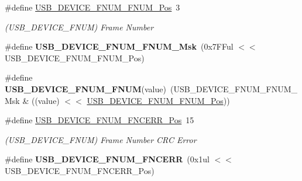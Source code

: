 \begin{DoxyCompactItemize}
\item 
\hypertarget{group___s_a_m_l21___u_s_b_ga6115591a45b1f5bccf3f15a866ed8e81}{}\#define \hyperlink{group___s_a_m_l21___u_s_b_ga6115591a45b1f5bccf3f15a866ed8e81}{U\+S\+B\+\_\+\+D\+E\+V\+I\+C\+E\+\_\+\+F\+N\+U\+M\+\_\+\+F\+N\+U\+M\+\_\+\+Pos}~3\label{group___s_a_m_l21___u_s_b_ga6115591a45b1f5bccf3f15a866ed8e81}

\begin{DoxyCompactList}\small\item\em (U\+S\+B\+\_\+\+D\+E\+V\+I\+C\+E\+\_\+\+F\+N\+U\+M) Frame Number \end{DoxyCompactList}\item 
\hypertarget{group___s_a_m_l21___u_s_b_ga586df4f24fdde9d2de83f1df4acfd328}{}\#define {\bfseries U\+S\+B\+\_\+\+D\+E\+V\+I\+C\+E\+\_\+\+F\+N\+U\+M\+\_\+\+F\+N\+U\+M\+\_\+\+Msk}~(0x7\+F\+Ful $<$$<$ U\+S\+B\+\_\+\+D\+E\+V\+I\+C\+E\+\_\+\+F\+N\+U\+M\+\_\+\+F\+N\+U\+M\+\_\+\+Pos)\label{group___s_a_m_l21___u_s_b_ga586df4f24fdde9d2de83f1df4acfd328}

\item 
\hypertarget{group___s_a_m_l21___u_s_b_ga12e0e871a60c0b24a96f098683db28e1}{}\#define {\bfseries U\+S\+B\+\_\+\+D\+E\+V\+I\+C\+E\+\_\+\+F\+N\+U\+M\+\_\+\+F\+N\+U\+M}(value)~(U\+S\+B\+\_\+\+D\+E\+V\+I\+C\+E\+\_\+\+F\+N\+U\+M\+\_\+\+F\+N\+U\+M\+\_\+\+Msk \& ((value) $<$$<$ \hyperlink{group___s_a_m_l21___u_s_b_ga6115591a45b1f5bccf3f15a866ed8e81}{U\+S\+B\+\_\+\+D\+E\+V\+I\+C\+E\+\_\+\+F\+N\+U\+M\+\_\+\+F\+N\+U\+M\+\_\+\+Pos}))\label{group___s_a_m_l21___u_s_b_ga12e0e871a60c0b24a96f098683db28e1}

\item 
\hypertarget{group___s_a_m_l21___u_s_b_ga60909e06a23bf87451ee1a0a2286ebeb}{}\#define \hyperlink{group___s_a_m_l21___u_s_b_ga60909e06a23bf87451ee1a0a2286ebeb}{U\+S\+B\+\_\+\+D\+E\+V\+I\+C\+E\+\_\+\+F\+N\+U\+M\+\_\+\+F\+N\+C\+E\+R\+R\+\_\+\+Pos}~15\label{group___s_a_m_l21___u_s_b_ga60909e06a23bf87451ee1a0a2286ebeb}

\begin{DoxyCompactList}\small\item\em (U\+S\+B\+\_\+\+D\+E\+V\+I\+C\+E\+\_\+\+F\+N\+U\+M) Frame Number C\+R\+C Error \end{DoxyCompactList}\item 
\hypertarget{group___s_a_m_l21___u_s_b_ga0d6db45a465e2482654886cd8ad006f2}{}\#define {\bfseries U\+S\+B\+\_\+\+D\+E\+V\+I\+C\+E\+\_\+\+F\+N\+U\+M\+\_\+\+F\+N\+C\+E\+R\+R}~(0x1ul $<$$<$ U\+S\+B\+\_\+\+D\+E\+V\+I\+C\+E\+\_\+\+F\+N\+U\+M\+\_\+\+F\+N\+C\+E\+R\+R\+\_\+\+Pos)\label{group___s_a_m_l21___u_s_b_ga0d6db45a465e2482654886cd8ad006f2}


\end{DoxyCompactItemize}
